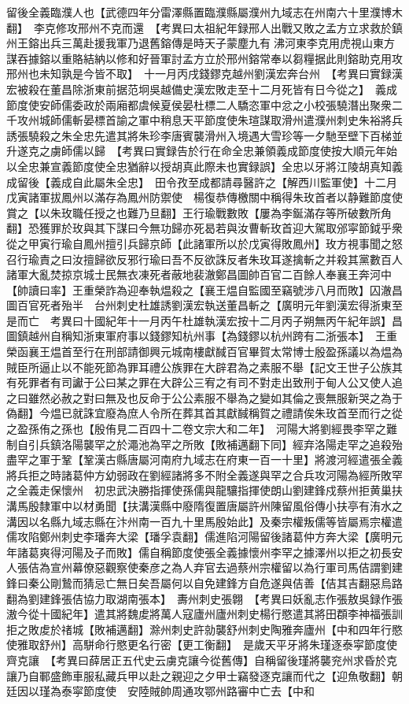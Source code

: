 留後全義臨濮人也【武德四年分雷澤縣置臨濮縣屬濮州九域志在州南六十里濮博木翻】　李克修攻邢州不克而還　【考異曰太祖紀年録邢人出戰又敗之孟方立求救於鎮州王鎔出兵三萬赴援我軍乃退舊鎔傳是時天子蒙塵九有沸河東李克用虎視山東方謀吞據鎔以重賂結納以修和好晉軍討孟方立於邢州鎔常奉以芻糧据此則鎔助克用攻邢州也未知孰是今皆不取】　十一月丙戌錢鏐克越州劉漢宏奔台州　【考異曰實録漢宏被殺在董昌除浙東前据范坰吳越備史漢宏敗走至十二月死皆有日今從之】　義成節度使安師儒委政於兩廂都虞候夏侯晏杜標二人驕恣軍中忿之小校張驍潛出聚衆二千攻州城師儒斬晏標首諭之軍中稍息天平節度使朱瑄謀取滑州遣濮州刺史朱裕將兵誘張驍殺之朱全忠先遣其將朱珍李唐賓襲滑州入境遇大雪珍等一夕馳至壁下百梯並升遂克之虜師儒以歸　【考異曰實録告於行在命全忠兼領義成節度使按大順元年始以全忠兼宣義節度使全忠猶辭以授胡真此際未也實録誤】全忠以牙將江陵胡真知義成留後【義成自此屬朱全忠】　田令孜至成都請尋醫許之【解西川監軍使】十二月戊寅諸軍拔鳳州以滿存為鳳州防禦使　楊復恭傳檄關中稱得朱玫首者以静難節度使賞之【以朱玫職任授之也難乃旦翻】王行瑜戰數敗【屢為李鋋滿存等所破數所角翻】恐獲罪於玫與其下謀曰今無功歸亦死曷若與汝曹斬玫首迎大駕取邠寜節鉞乎衆從之甲寅行瑜自鳳州擅引兵歸京師【此諸軍所以於戊寅得敗鳳州】玫方視事聞之怒召行瑜責之曰汝擅歸欲反邪行瑜曰吾不反欲誅反者朱玫耳遂擒斬之并殺其黨數百人諸軍大亂焚掠京城士民無衣凍死者蔽地裴澈鄭昌圖帥百官二百餘人奉襄王奔河中【帥讀曰率】王重榮詐為迎奉執煴殺之【襄王煴自監國至竊號涉八月而敗】囚澈昌圖百官死者殆半　台州刺史杜雄誘劉漢宏執送董昌斬之【廣明元年劉漢宏得浙東至是而亡　考異曰十國紀年十一月丙午杜雄執漢宏按十二月丙子朔無丙午紀年誤】昌圖鎮越州自稱知浙東軍府事以錢鏐知杭州事【為錢鏐以杭州跨有二浙張本】　王重榮函襄王煴首至行在刑部請御興元城南樓獻馘百官畢賀太常博士殷盈孫議以為煴為賊臣所逼止以不能死節為罪耳禮公族罪在大辟君為之素服不舉【記文王世子公族其有死罪者有司讞于公曰某之罪在大辟公三宥之有司不對走出致刑于甸人公又使人追之曰雖然必赦之對曰無及也反命于公公素服不舉為之變如其倫之喪無服新哭之為于偽翻】今煴已就誅宜廢為庶人令所在葬其首其獻馘稱賀之禮請俟朱玫首至而行之從之盈孫侑之孫也【殷侑見二百四十二卷文宗大和二年】　河陽大將劉經畏李罕之難制自引兵鎮洛陽襲罕之於澠池為罕之所敗【敗補邁翻下同】經弃洛陽走罕之追殺殆盡罕之軍于鞏【鞏漢古縣唐屬河南府九域志在府東一百一十里】將渡河經遣張全義將兵拒之時諸葛仲方幼弱政在劉經諸將多不附全義遂與罕之合兵攻河陽為經所敗罕之全義走保懷州　初忠武決勝指揮使孫儒與龍驤指揮使朗山劉建鋒戍蔡州拒黄巢扶溝馬殷隸軍中以材勇聞【扶溝漢縣中廢隋復置唐屬許州陳留風俗傳小扶亭有洧水之溝因以名縣九域志縣在汴州南一百九十里馬殷始此】及秦宗權叛儒等皆屬焉宗權遣儒攻陷鄭州刺史李璠奔大梁【璠孚袁翻】儒進陷河陽留後諸葛仲方奔大梁【廣明元年諸葛爽得河陽及子而敗】儒自稱節度使張全義據懷州李罕之據澤州以拒之初長安人張佶為宣州幕僚惡觀察使秦彦之為人弃官去過蔡州宗權留以為行軍司馬佶謂劉建鋒曰秦公剛鷙而猜忌亡無日矣吾屬何以自免建鋒方自危遂與佶善【佶其吉翻惡烏路翻為劉建鋒張佶協力取湖南張本】　夀州刺史張翺　【考異曰妖亂志作張敖吳録作張滶今從十國紀年】遣其將魏䖍將萬人寇廬州廬州刺史楊行愍遣其將田頵李神福張訓拒之敗䖍於禇城【敗補邁翻】滁州刺史許勍襲舒州刺史陶雅奔廬州【中和四年行愍使雅取舒州】高駢命行愍更名行密【更工衡翻】　是歲天平牙將朱瑾逐泰寜節度使齊克讓　【考異曰薛居正五代史云虜克讓今從舊傳】自稱留後瑾將襲兖州求昏於克讓乃自鄆盛飾車服私藏兵甲以赴之親迎之夕甲士竊發逐克讓而代之【迎魚敬翻】朝廷因以瑾為泰寜節度使　安陸賊帥周通攻鄂州路審中亡去【中和